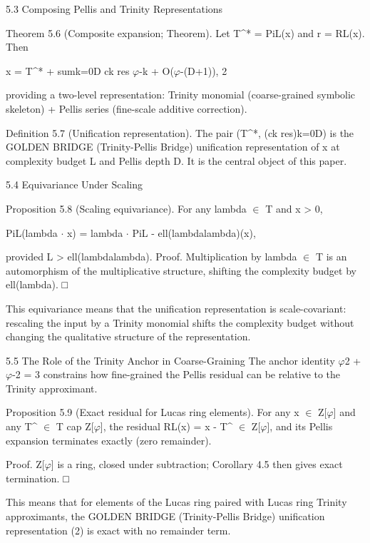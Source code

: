   5.3 Composing Pellis and Trinity Representations

        Theorem 5.6 (Composite expansion; Theorem). Let T\textasciicircum{}* = PiL(x) and r =
        RL(x). Then

  x = T\textasciicircum{}* + sumk=0D ck res $\varphi$-k + O($\varphi$-(D+1)), 2

  providing a two-level representation: Trinity monomial (coarse-grained symbolic
  skeleton) + Pellis series (fine-scale additive correction).

        Definition 5.7 (Unification representation). The pair (T\textasciicircum{}*, (ck res)k=0D) is
        the GOLDEN BRIDGE (Trinity-Pellis Bridge) unification representation of x at complexity budget L and Pellis
        depth D. It is the central object of this paper.

  5.4 Equivariance Under Scaling

        Proposition 5.8 (Scaling equivariance). For any lambda $\in$ T and x > 0,

  PiL(lambda $\cdot$ x) = lambda $\cdot$ PiL - ell(lambdalambda)(x),

  provided L > ell(lambdalambda). Proof. Multiplication by lambda $\in$ T is an
  automorphism of the multiplicative structure, shifting the complexity budget by
  ell(lambda). □

  This equivariance means that the unification representation is scale-covariant:
  rescaling the input by a Trinity monomial shifts the complexity budget without
  changing the qualitative structure of the representation.

  5.5 The Role of the Trinity Anchor in Coarse-Graining
  The anchor identity $\varphi$2 + $\varphi$-2 = 3 constrains how fine-grained the Pellis residual can be
  relative to the Trinity approximant.

        Proposition 5.9 (Exact residual for Lucas ring elements). For any x $\in$ Z[$\varphi$]
        and any T\textasciicircum{} $\in$ T cap Z[$\varphi$], the residual RL(x) = x - T\textasciicircum{} $\in$ Z[$\varphi$], and its Pellis
        expansion terminates exactly (zero remainder).

        Proof. Z[$\varphi$] is a ring, closed under subtraction; Corollary 4.5 then gives exact
        termination. □

  This means that for elements of the Lucas ring paired with Lucas ring Trinity
  approximants, the GOLDEN BRIDGE (Trinity-Pellis Bridge) unification representation (2) is exact with no
  remainder term.

